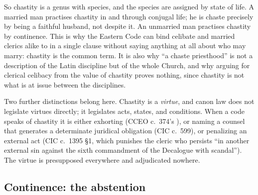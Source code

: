 So chastity is a genus with species, and the species are assigned by state of life. A married man practises chastity in and through conjugal life; he is chaste precisely by being a faithful husband, not despite it. An unmarried man practises chastity by continence. This is why the Eastern Code can bind celibate and married clerics alike to  in a single clause without saying anything at all about who may marry: chastity is the common term. It is also why ``a chaste priesthood'' is not a description of the Latin discipline but of the whole Church, and why arguing for clerical celibacy from the value of chastity proves nothing, since chastity is not what is at issue between the disciplines.

Two further distinctions belong here. Chastity is a \emph{virtue}, and canon law does not legislate virtues directly; it legislates acts, states, and conditions. When a code speaks of chastity it is either exhorting (CCEO c.~374's ), or naming a counsel that generates a determinate juridical obligation (CIC c.~599), or penalizing an external act (CIC c.~1395 §1, which punishes the cleric who persists ``in another external sin against the sixth commandment of the Decalogue with scandal''). The virtue is presupposed everywhere and adjudicated nowhere.

\subsection{Continence: the abstention}

